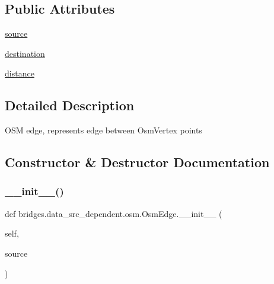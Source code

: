 \subsection*{Public Attributes}
\begin{DoxyCompactItemize}
\item 
\mbox{\hyperlink{classbridges_1_1data__src__dependent_1_1osm_1_1_osm_edge_a968664892933e9784909282cc53b0315}{source}}
\item 
\mbox{\hyperlink{classbridges_1_1data__src__dependent_1_1osm_1_1_osm_edge_aa81426d41bd031b2fa3789173206c0dc}{destination}}
\item 
\mbox{\hyperlink{classbridges_1_1data__src__dependent_1_1osm_1_1_osm_edge_aed843c7fcb887bb11b609387fc3af35f}{distance}}
\end{DoxyCompactItemize}


\subsection{Detailed Description}
\begin{DoxyVerb}OSM edge, represents edge between OsmVertex points
\end{DoxyVerb}
 

\subsection{Constructor \& Destructor Documentation}
\mbox{\label{classbridges_1_1data__src__dependent_1_1osm_1_1_osm_edge_ac0f57be58220744c49bffc353d73db6f}} 
\subsubsection{\texorpdfstring{\+\_\+\+\_\+init\+\_\+\+\_\+()}{\_\_init\_\_()}}
{\footnotesize\ttfamily def bridges.\+data\+\_\+src\+\_\+dependent.\+osm.\+Osm\+Edge.\+\_\+\+\_\+init\+\_\+\+\_\+ (\begin{DoxyParamCaption}\item[{}]{self,  }\item[{}]{source }\end{DoxyParamCaption})}



